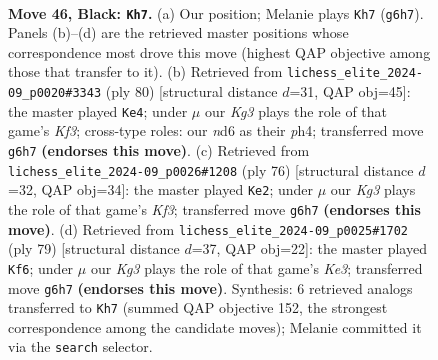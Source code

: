 \documentclass[11pt]{article}
\begin{document}
\clearpage

\begin{figure}[p]\centering
\begin{subfigure}{0.46\textwidth}\centering
\resizebox{\linewidth}{!}{%
\newchessgame
\chessboard[
  setfen={1R6/6p1/3Nppk1/7p/1p1P1P1P/1r2P1PK/8/8 b - - 1 46},
  showmover=false,
  pgfstyle=straightmove, color=movearrow, markmove={g6-h7}
]}
\caption{}
\end{subfigure}\hfill
\begin{subfigure}{0.46\textwidth}\centering
\resizebox{\linewidth}{!}{%
\newchessgame
\chessboard[
  setfen={R7/P4p2/4pk2/6p1/6Pp/4PK1P/r4P2/8 w - - 1 41},
  showmover=false,
  pgfstyle=straightmove, color=movearrow, markmove={f3-e4}
]}
\caption{}
\end{subfigure}
\\[4pt]
\begin{subfigure}{0.46\textwidth}\centering
\resizebox{\linewidth}{!}{%
\newchessgame
\chessboard[
  setfen={R7/P5k1/4p1p1/5p1p/4PP2/r4KPP/8/8 w - - 1 39},
  showmover=false,
  pgfstyle=straightmove, color=movearrow, markmove={f3-e2}
]}
\caption{}
\end{subfigure}\hfill
\begin{subfigure}{0.46\textwidth}\centering
\resizebox{\linewidth}{!}{%
\newchessgame
\chessboard[
  setfen={8/R7/p3k1p1/3p1p2/3P3P/4PKP1/r4P2/8 b - - 7 40},
  showmover=false,
  pgfstyle=straightmove, color=movearrow, markmove={e6-f6}
]}
\caption{}
\end{subfigure}
\caption{\textbf{Move 46, Black: \texttt{Kh7}.} (a) Our position; Melanie plays \texttt{Kh7} (\texttt{g6h7}). Panels (b)--(d) are the retrieved master positions whose correspondence most drove this move (highest QAP objective among those that transfer to it). (b) Retrieved from \texttt{lichess\_elite\_2024-09\_p0020\#3343} (ply 80) [structural distance $d$=31, QAP obj=45]: the master played \texttt{Ke4}; under $\mu$ our \emph{Kg3} plays the role of that game's \emph{Kf3}; cross-type roles: our \emph{n}d6 as their \emph{p}h4; transferred move \texttt{g6h7} \textbf{(endorses this move)}. (c) Retrieved from \texttt{lichess\_elite\_2024-09\_p0026\#1208} (ply 76) [structural distance $d$=32, QAP obj=34]: the master played \texttt{Ke2}; under $\mu$ our \emph{Kg3} plays the role of that game's \emph{Kf3}; transferred move \texttt{g6h7} \textbf{(endorses this move)}. (d) Retrieved from \texttt{lichess\_elite\_2024-09\_p0025\#1702} (ply 79) [structural distance $d$=37, QAP obj=22]: the master played \texttt{Kf6}; under $\mu$ our \emph{Kg3} plays the role of that game's \emph{Ke3}; transferred move \texttt{g6h7} \textbf{(endorses this move)}. Synthesis: 6 retrieved analogs transferred to \texttt{Kh7} (summed QAP objective 152, the strongest correspondence among the candidate moves); Melanie committed it via the \texttt{search} selector.}
\label{fig:thought-m91}
\end{figure}
\end{document}
